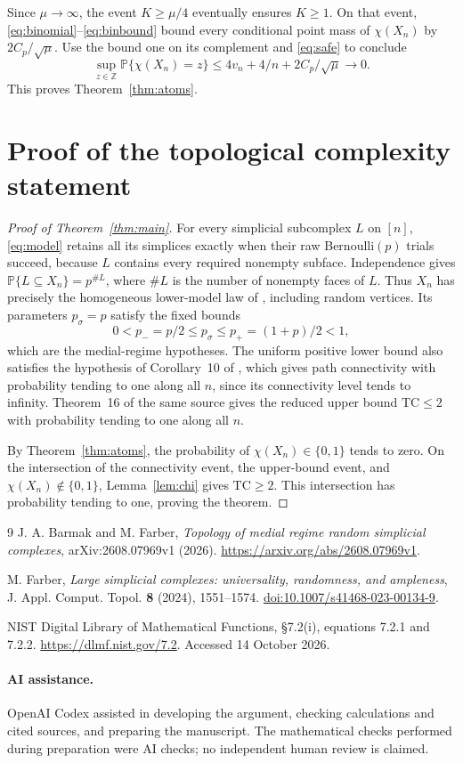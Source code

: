 \documentclass[11pt,a4paper]{article}
\newcommand{\Prob}{\mathbb P}
\newcommand{\TC}{\mathrm{TC}}
\begin{document}
Since $\mu\to\infty$, the event $K\ge\mu/4$ eventually ensures $K\ge1$.
On that event, \eqref{eq:binomial}--\eqref{eq:binbound} bound every
conditional point mass of $\chi(X_n)$ by $2C_p/\sqrt\mu$.
Use the bound one on its complement and \eqref{eq:safe} to conclude
\[
\sup_{z\in\mathbb Z}\Prob\{\chi(X_n)=z\}
\le4v_n+4/n+2C_p/\sqrt\mu\longrightarrow0.
\]
This proves Theorem~\ref{thm:atoms}.

\section{Proof of the topological complexity statement}

\begin{proof}[Proof of Theorem~\ref{thm:main}]
For every simplicial subcomplex $L$ on $[n]$, \eqref{eq:model} retains
all its simplices exactly when their raw Bernoulli$(p)$ trials succeed,
because $L$ contains every required nonempty subface. Independence gives
$\Prob\{L\subseteq X_n\}=p^{\#L}$, where $\#L$ is the number of nonempty
faces of $L$. Thus $X_n$ has precisely the homogeneous lower-model law of
\cite[\S3.1 and \S6.1]{BF2026}, including random vertices.
Its parameters $p_\sigma=p$ satisfy the fixed bounds
\[
0<p_-=p/2\le p_\sigma\le p_+=(1+p)/2<1,
\]
which are the medial-regime hypotheses. The uniform positive lower bound
also satisfies the hypothesis of Corollary~10 of \cite{BF2026},
which gives path connectivity with
probability tending to one along all $n$, since its connectivity level
tends to infinity. Theorem~16 of the same source gives the reduced upper
bound $\TC\le2$ with probability tending to one along all $n$.

By Theorem~\ref{thm:atoms}, the probability of
$\chi(X_n)\in\{0,1\}$ tends to zero. On the intersection of the connectivity
event, the upper-bound event, and $\chi(X_n)\notin\{0,1\}$,
Lemma~\ref{lem:chi} gives $\TC\ge2$. This intersection has probability
tending to one, proving the theorem.
\end{proof}

\begin{thebibliography}{9}
J. A. Barmak and M. Farber,
\emph{Topology of medial regime random simplicial complexes},
arXiv:2608.07969v1 (2026).
\url{https://arxiv.org/abs/2608.07969v1}.

M. Farber,
\emph{Large simplicial complexes: universality, randomness, and ampleness},
J. Appl. Comput. Topol. \textbf{8} (2024), 1551--1574.
\href{https://doi.org/10.1007/s41468-023-00134-9}
{doi:10.1007/s41468-023-00134-9}.

NIST Digital Library of Mathematical Functions,
\S7.2(i), equations 7.2.1 and 7.2.2.
\url{https://dlmf.nist.gov/7.2}.
Accessed 14 October 2026.
\end{thebibliography}

\paragraph{AI assistance.}
OpenAI Codex assisted in developing the argument, checking calculations
and cited sources, and preparing the manuscript. The mathematical checks
performed during preparation were AI checks; no independent human review
is claimed.
\end{document}
